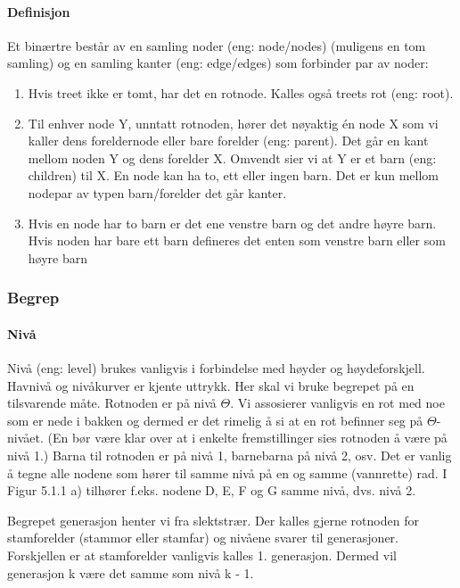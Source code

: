 \documentclass[11pt]{article}
\begin{document}
        \paragraph{Definisjon}
        Et binærtre består av en samling noder (eng: node/nodes) (muligens en tom
        samling) og en samling kanter (eng: edge/edges) som forbinder par av noder:
        \begin{enumerate}
            \item Hvis treet ikke er tomt, har det en rotnode. Kalles også treets rot (eng: root).
            \item Til enhver node Y, unntatt rotnoden, hører det nøyaktig én node X som vi kaller dens
                foreldernode eller bare forelder (eng: parent). Det går en kant mellom noden Y og dens
                forelder X. Omvendt sier vi at Y er et barn (eng: children) til X. En node kan ha to, ett
                eller ingen barn. Det er kun mellom nodepar av typen barn/forelder det går kanter.
            \item Hvis en node har to barn er det ene venstre barn og det andre høyre barn. Hvis noden
                har bare ett barn defineres det enten som venstre barn eller som høyre barn
        \end{enumerate}

        \subsubsection{Begrep}
            \paragraph{Nivå}
            Nivå (eng: level) brukes vanligvis i forbindelse med høyder og høydeforskjell. Havnivå og
            nivåkurver er kjente uttrykk. Her skal vi bruke begrepet på en tilsvarende måte. Rotnoden er
            på nivå $\Theta$. Vi assosierer vanligvis en rot med noe som er nede i bakken og dermed er det
            rimelig å si at en rot befinner seg på $\Theta$-nivået. (En bør være klar over at i enkelte
            fremstillinger sies rotnoden å være på nivå 1.) Barna til rotnoden er på nivå 1, barnebarna på
            nivå 2, osv. Det er vanlig å tegne alle nodene som hører til samme nivå på en og samme
            (vannrette) rad. I Figur 5.1.1 a) tilhører f.eks. nodene D, E, F og G samme nivå, dvs. nivå 2.

            Begrepet generasjon henter vi fra slektstrær. Der kalles gjerne rotnoden for stamforelder
            (stammor eller stamfar) og nivåene svarer til generasjoner. Forskjellen er at stamforelder
            vanligvis kalles 1. generasjon. Dermed vil generasjon k være det samme som nivå k - 1.
\end{document}

